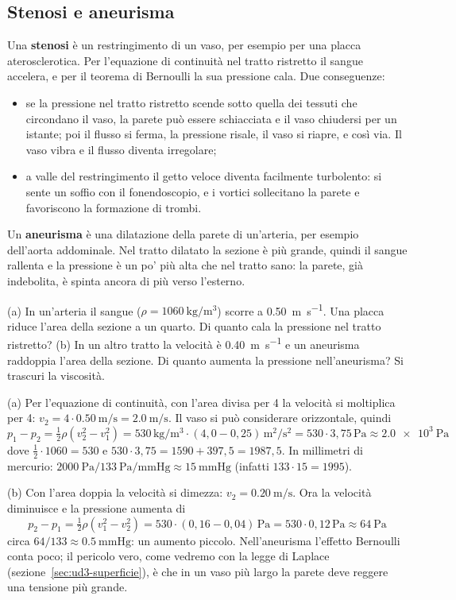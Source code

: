 \subsection{Stenosi e aneurisma}

Una \textbf{stenosi} è un restringimento di un vaso, per esempio per una placca aterosclerotica. Per l'equazione di continuità nel tratto ristretto il sangue accelera, e per il teorema di Bernoulli la sua pressione cala. Due conseguenze:
\begin{itemize}
  \item se la pressione nel tratto ristretto scende sotto quella dei tessuti che circondano il vaso, la parete può essere schiacciata e il vaso chiudersi per un istante; poi il flusso si ferma, la pressione risale, il vaso si riapre, e così via. Il vaso vibra e il flusso diventa irregolare;
  \item a valle del restringimento il getto veloce diventa facilmente turbolento: si sente un soffio con il fonendoscopio, e i vortici sollecitano la parete e favoriscono la formazione di trombi.
\end{itemize}

Un \textbf{aneurisma} è una dilatazione della parete di un'arteria, per esempio dell'aorta addominale. Nel tratto dilatato la sezione è più grande, quindi il sangue rallenta e la pressione è un po' più alta che nel tratto sano: la parete, già indebolita, è spinta ancora di più verso l'esterno.

\begin{esempio}
(a) In un'arteria il sangue ($\rho = \SI{1060}{\kilo\gram\per\metre\cubed}$) scorre a \SI{0,50}{\metre\per\second}. Una placca riduce l'area della sezione a un quarto. Di quanto cala la pressione nel tratto ristretto? (b) In un altro tratto la velocità è \SI{0,40}{\metre\per\second} e un aneurisma raddoppia l'area della sezione. Di quanto aumenta la pressione nell'aneurisma? Si trascuri la viscosità.

(a) Per l'equazione di continuità, con l'area divisa per 4 la velocità si moltiplica per 4: $v_2 = 4 \cdot \SI{0,50}{\metre\per\second} = \SI{2,0}{\metre\per\second}$. Il vaso si può considerare orizzontale, quindi
\[
  p_1 - p_2 = \tfrac{1}{2}\rho\left(v_2^2 - v_1^2\right) = 530\,\si{\kilo\gram\per\metre\cubed} \cdot (4{,}0 - 0{,}25)\,\si{\metre\squared\per\second\squared} = 530 \cdot 3{,}75\,\si{\pascal} \approx \SI{2,0e3}{\pascal}
\]
dove $\frac{1}{2} \cdot 1060 = 530$ e $530 \cdot 3{,}75 = 1590 + 397{,}5 = 1987{,}5$. In millimetri di mercurio: $\SI{2000}{\pascal}/\SI{133}{\pascal\per\mmHg} \approx \SI{15}{\mmHg}$ (infatti $133 \cdot 15 = 1995$).

(b) Con l'area doppia la velocità si dimezza: $v_2 = \SI{0,20}{\metre\per\second}$. Ora la velocità diminuisce e la pressione aumenta di
\[
  p_2 - p_1 = \tfrac{1}{2}\rho\left(v_1^2 - v_2^2\right) = 530 \cdot (0{,}16 - 0{,}04)\,\si{\pascal} = 530 \cdot 0{,}12\,\si{\pascal} \approx \SI{64}{\pascal}
\]
circa $64/133 \approx \SI{0,5}{\mmHg}$: un aumento piccolo. Nell'aneurisma l'effetto Bernoulli conta poco; il pericolo vero, come vedremo con la legge di Laplace (sezione~\ref{sec:ud3-superficie}), è che in un vaso più largo la parete deve reggere una tensione più grande.
\end{esempio}

